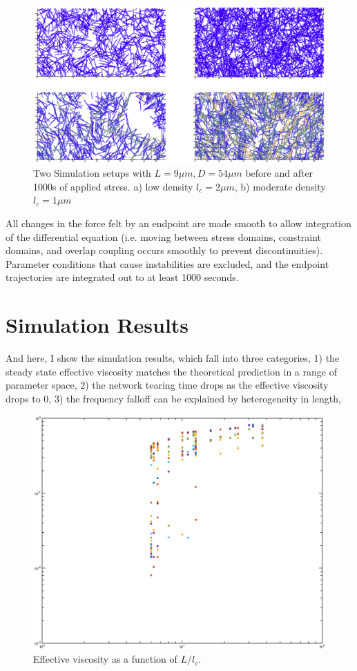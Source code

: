 \documentclass[prb,11pt]{revtex4-1}
\begin{document}
\begin{figure}[h!]
\centering
\includegraphics[width=\textwidth]{network_def}
\caption{\label{fig:sim}Two Simulation setups with $L=9 \mu m, D = 54 \mu m$ before and after 1000s of applied stress. a) low density $l_c=2 \mu m$, b) moderate density $l_c=1 \mu m$ }
\end{figure}


All changes in the force felt by an endpoint are made smooth to allow integration of the differential equation (i.e. moving between stress domains, constraint domains, and overlap coupling occurs smoothly to prevent discontinuities).  Parameter conditions that cause instabilities are excluded, and the endpoint trajectories are integrated out to at least 1000 seconds. 


\section{Simulation Results}

And here, I show the simulation results, which fall into three categories, 1) the steady state effective viscosity matches the theoretical prediction in a range of parameter space, 2) the network tearing time drops as the effective viscosity drops to 0, 3) the frequency falloff can be explained by heterogeneity in length, 

\begin{figure}[h!]
\centering
\includegraphics[width=\textwidth]{eff_vic}
\caption{\label{fig:effvic}Effective viscosity as a function of $L/l_c$.}
\end{figure}
\end{document}
